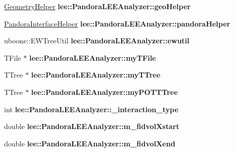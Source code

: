 \begin{DoxyCompactItemize}
\item 
\hypertarget{group__lee_gaa53a7fef751a9f2aa891b067875eb19b}{\hyperlink{classGeometryHelper}{Geometry\-Helper} {\bfseries lee\-::\-Pandora\-L\-E\-E\-Analyzer\-::geo\-Helper}}\label{group__lee_gaa53a7fef751a9f2aa891b067875eb19b}

\item 
\hypertarget{group__lee_ga00fc07207cfb81cd3cbbe5a8785d3c23}{\hyperlink{classPandoraInterfaceHelper}{Pandora\-Interface\-Helper} {\bfseries lee\-::\-Pandora\-L\-E\-E\-Analyzer\-::pandora\-Helper}}\label{group__lee_ga00fc07207cfb81cd3cbbe5a8785d3c23}

\item 
\hypertarget{group__lee_gaf8493a6adc146f58425a9808bde7de2f}{uboone\-::\-E\-W\-Tree\-Util {\bfseries lee\-::\-Pandora\-L\-E\-E\-Analyzer\-::ewutil}}\label{group__lee_gaf8493a6adc146f58425a9808bde7de2f}

\item 
\hypertarget{group__lee_ga8a86ec4686558f03c8a2be30a6bbcc2a}{T\-File $\ast$ {\bfseries lee\-::\-Pandora\-L\-E\-E\-Analyzer\-::my\-T\-File}}\label{group__lee_ga8a86ec4686558f03c8a2be30a6bbcc2a}

\item 
\hypertarget{group__lee_ga20daae4b8c56ed5c2c2fd6b7b2a490dc}{T\-Tree $\ast$ {\bfseries lee\-::\-Pandora\-L\-E\-E\-Analyzer\-::my\-T\-Tree}}\label{group__lee_ga20daae4b8c56ed5c2c2fd6b7b2a490dc}

\item 
\hypertarget{group__lee_ga3c10053a4ef8cb336589fb86a5b6f587}{T\-Tree $\ast$ {\bfseries lee\-::\-Pandora\-L\-E\-E\-Analyzer\-::my\-P\-O\-T\-T\-Tree}}\label{group__lee_ga3c10053a4ef8cb336589fb86a5b6f587}

\item 
\hypertarget{group__lee_gafd61fa715317d7a54f36339589736b1e}{int {\bfseries lee\-::\-Pandora\-L\-E\-E\-Analyzer\-::\-\_\-interaction\-\_\-type}}\label{group__lee_gafd61fa715317d7a54f36339589736b1e}

\item 
\hypertarget{group__lee_ga56d3f395f76ae35174ea4714598debb2}{double {\bfseries lee\-::\-Pandora\-L\-E\-E\-Analyzer\-::m\-\_\-fidvol\-Xstart}}\label{group__lee_ga56d3f395f76ae35174ea4714598debb2}

\item 
\hypertarget{group__lee_gac263324598456c587395ce39f9a86b4a}{double {\bfseries lee\-::\-Pandora\-L\-E\-E\-Analyzer\-::m\-\_\-fidvol\-Xend}}\label{group__lee_gac263324598456c587395ce39f9a86b4a}


\end{DoxyCompactItemize}
